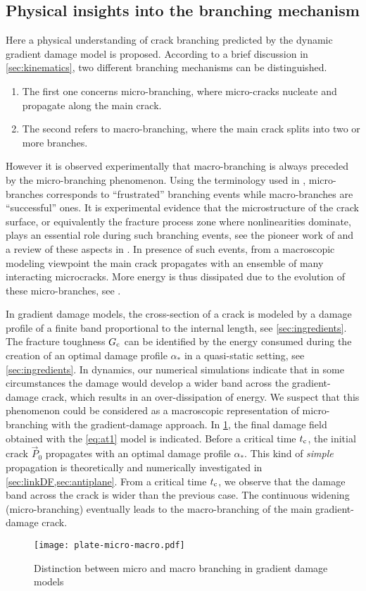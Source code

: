 \subsection{Physical insights into the branching mechanism} \label{sec:microbrachingstu}
Here a physical understanding of crack branching predicted by the dynamic gradient damage model is proposed. According to a brief discussion in \cref{sec:kinematics}, two different branching mechanisms can be distinguished.
\begin{enumerate}
\item The first one concerns micro-branching, where micro-cracks nucleate and propagate along the main crack.
\item The second refers to macro-branching, where the main crack splits into two or more branches.
\end{enumerate}
However it is observed experimentally that macro-branching is always preceded by the micro-branching phenomenon. Using the terminology used in \cite{SharonFineberg:1996}, micro-branches corresponds to ``frustrated'' branching events while macro-branches are ``successful'' ones. It is experimental evidence that the microstructure of the crack surface, or equivalently the fracture process zone where nonlinearities dominate, plays an essential role during such branching events, see the pioneer work of \cite{Ravi-ChandarKnauss:1984,Ravi-ChandarKnauss:1984a} and a review of these aspects in \cite{FinebergMarder:1999}. In presence of such events, from a macroscopic modeling viewpoint the main crack propagates with an ensemble of many interacting microcracks. More energy is thus dissipated due to the evolution of these micro-branches, see \cite{SharonGrossFineberg:1996}.

In gradient damage models, the cross-section of a crack is modeled by a damage profile of a finite band proportional to the internal length, see \cref{sec:ingredients}. The fracture toughness $G_\mathrm{c}$ can be identified by the energy consumed during the creation of an optimal damage profile $\alpha_*$ in a quasi-static setting, see \cref{sec:ingredients}. In dynamics, our numerical simulations indicate that in some circumstances the damage would develop a wider band across the gradient-damage crack, which results in an over-dissipation of energy. We suspect that this phenomenon could be considered as a macroscopic representation of micro-branching with the gradient-damage approach. In \cref{fig:micro-macro}, the final damage field obtained with the \eqref{eq:at1} model is indicated. Before a critical time $t_{\mathrm{c}}$, the initial crack $\vec{P}_0$ propagates with an optimal damage profile $\alpha_*$. This kind of \emph{simple} propagation is theoretically and numerically investigated in \cref{sec:linkDF,sec:antiplane}. From a critical time $t_{\mathrm{c}}$, we observe that the damage band across the crack is wider than the previous case. The continuous widening (micro-branching) eventually leads to the macro-branching of the main gradient-damage crack. 
\begin{figure}[htbp]
\centering
\texttt{[image: plate-micro-macro.pdf]}
\caption{Distinction between micro and macro branching in gradient damage models} \label{fig:micro-macro}
\end{figure}

